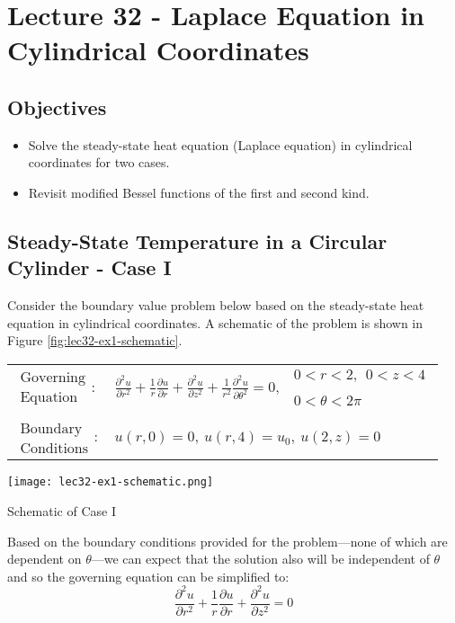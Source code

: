 \chapter{Lecture 32 - Laplace Equation in Cylindrical Coordinates}
\label{ch:lec32}
\section{Objectives}
\begin{itemize}
\item Solve the steady-state heat equation (Laplace equation) in cylindrical coordinates for two cases.
\item Revisit modified Bessel functions of the first and second kind.
\end{itemize}
\setcounter{lstannotation}{0}

\section{Steady-State Temperature in a Circular Cylinder - Case I}
Consider the boundary value problem below based on the steady-state heat equation in cylindrical coordinates. A schematic of the problem is shown in Figure \ref{fig:lec32-ex1-schematic}.
\begin{table}[h]
\begin{tabular}{l l}
$\substack{\text{Governing} \\\text{Equation}}: $& $\frac{\partial^2 u}{\partial r^2} + \frac{1}{r}\frac{\partial u}{\partial r} + \frac{\partial^2 u}{\partial z^2} + \frac{1}{r^2}\frac{\partial^2 u}{\partial \theta^2}= 0, \ \ \substack{0<r<2, \ \ 0<z<4 \\ \\ 0<\theta<2 \pi}$\\
& \\
$\substack{\text{Boundary} \\ \text{Conditions}}: $ & $u(r,0) = 0, \ u(r,4) = u_0, \ u(2,z) = 0$  \\ 
\end{tabular}
\end{table} 
\begin{marginfigure}
\texttt{[image: lec32-ex1-schematic.png]}
\caption{Schematic of Case I}
\label{fig:lec32-ex1-schematic}
\end{marginfigure}

\vspace{0.25cm}

\noindent Based on the boundary conditions provided for the problem---none of which are dependent on $\theta$---we can expect that the solution also will be independent of $\theta$ and so the governing equation can be simplified to:
\begin{equation*}
\frac{\partial^2 u}{\partial r^2} + \frac{1}{r}\frac{\partial u}{\partial r} + \frac{\partial^2 u}{\partial z^2} = 0
\end{equation*}

